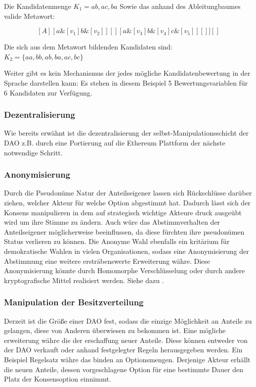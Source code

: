 \documentclass[a4paper,12pt]{report}
\begin{document}
Die Kandidatenmenge $K_1={ab, ac, ba}$
Sowie das anhand des Ableitungbaumes valide Metawort: 

\[ [A][ a\&[v_1]b\&[v_2] ][][ a\&[v_3]b\&[v_4]c\&[v_5] ][] ][] \] 


Die sich aus dem Metawort bildenden Kandidaten sind: $K_2=\{ aa, bb, ab, ba, ac, bc \}$

Weiter gibt es kein Mechanismus der jedes mögliche Kandidatenbewertung in der Sprache darstellen kann: Es stehen in diesem Beispiel 5 Bewertungsvariablen für 6 Kandidaten zur Verfügung. 

\subsubsection*{Dezentralisierung}
Wie bereits erwähnt ist die dezentralisierung der selbst-Manipulationsschicht der DAO z.B. durch eine Portierung auf die Ethereum Plattform der nächste notwendige Schritt.

\subsubsection*{Anonymisierung}
Durch die Pseudonüme Natur der Anteilseigener lassen sich Rückschlüsse darüber ziehen, welcher Akteur für welche Option abgestimmt hat. Dadurch lässt sich der Konsens manipulieren in dem auf strategisch wichtige Akteure druck ausgeübt wird um ihre Stimme zu ändern. Auch würe das Abstimmverhalten der Anteilseigener möglicherweise beeinflussen, da diese fürchten ihre pseudonümen Status verlieren zu können. Die Anonyme Wahl ebenfalls ein kritärium für demokratische Wahlen in vielen Organisationen, sodass eine Anonymisierung der Abstimmung eine weitere ersträbenswerte Erweiterung währe. Diese Anonymisierung könnte durch Homomorphe Verschlüsselung\cite{Gentry2009} oder durch andere kryptografische Mittel realisiert werden. Siehe dazu \cite{Fouard}.

\subsubsection*{Manipulation der Besitzverteilung}
Derzeit ist die Größe einer DAO fest, sodass die einzige Möglichkeit an Anteile zu gelangen, diese von Anderen überwiesen zu bekommen ist. Eine mögliche erweiterung währe die der erschaffung neuer Anteile. Diese können entweder von der DAO verkauft oder anhand festgelegter Regeln herausgegeben werden. Ein Beispiel Regelsatz währe das binden an Optionsmengen. Derjenige Akteur erhällt die neuen Anteile, dessen vorgeschlagene Option für eine bestimmte Dauer den Platz der Konsensoption einnimmt.
\end{document}
